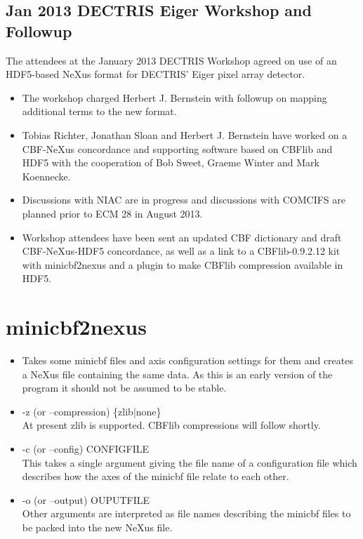 \documentclass[11pt]{a0poster}
\begin{document}
\begin{minipage}[]{0.29\linewidth}
\subsection*{Jan 2013 DECTRIS Eiger Workshop and Followup}
 
The attendees at the January 2013 DECTRIS Workshop agreed on use of an HDF5-based NeXus format for DECTRIS’ Eiger pixel array detector.

\begin{itemize}
\item{The workshop charged Herbert J. Bernstein with followup on mapping additional terms to the new format.}
\item{Tobias Richter, Jonathan Sloan and Herbert J. Bernstein have worked on a CBF-NeXus concordance and supporting software based on CBFlib and HDF5 with the cooperation of Bob Sweet, Graeme Winter and Mark Koennecke.}
\item{Discussions with NIAC are in progress and discussions with COMCIFS are planned prior to ECM 28 in August 2013.}
\item{Workshop attendees have been sent an updated CBF dictionary and draft CBF-NeXus-HDF5 concordance, as well as a link to a CBFlib-0.9.2.12 kit with minicbf2nexus and a plugin to make CBFlib compression available in HDF5.}
\end{itemize}

 
\end{minipage}\hspace{10mm}\hfill\begin{minipage}[]{0.29\linewidth}

\section*{minicbf2nexus}

\begin{itemize}
\item{Takes some minicbf files and axis configuration settings for them and creates a NeXus file containing the same data. As this is an early version of the program it should not be assumed to be stable.}
\item{-z (or –compression)  \{zlib|none\}\\
\vspace{-2mm}
\noindent{}At present zlib is supported.  CBFlib compressions will follow shortly.}
\vspace{2mm}
\item{-c (or –config) CONFIGFILE\\
\vspace{-2mm}
\noindent{}This takes a single argument giving the file name of a configuration file which describes how the axes of the minicbf file relate to each other.}
\vspace{2mm}
\item{-o (or –output) OUPUTFILE\\
\vspace{-2mm}
\noindent{}Other arguments are interpreted as file names describing the minicbf files to be packed into the new NeXus file.}


\end{itemize}
\end{minipage}
\end{document}
